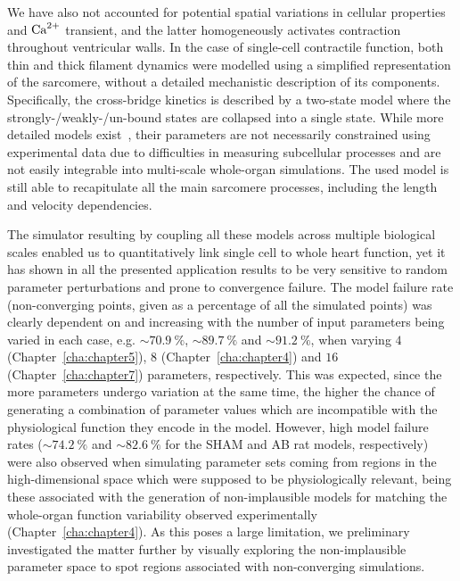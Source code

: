 \vspace{0.2cm}
We have also not accounted for potential spatial variations in cellular properties and $\textrm{Ca}^{2+}$ transient, and the latter homogeneously activates contraction throughout ventricular walls. In the case of single-cell contractile function, both thin and thick filament dynamics were modelled using a simplified representation of the sarcomere, without a detailed mechanistic description of its components. Specifically, the cross-bridge kinetics is described by a two-state model where the strongly-/weakly-/un-bound states are collapsed into a single state. While more detailed models exist~\cite{Land:2015}, their parameters are not necessarily constrained using experimental data due to difficulties in measuring subcellular processes and are not easily integrable into multi-scale whole-organ simulations. The used model is still able to recapitulate all the main sarcomere processes, including the length and velocity dependencies.

\vspace{0.2cm}
The simulator resulting by coupling all these models across multiple biological scales enabled us to quantitatively link single cell to whole heart function, yet it has shown in all the presented application results to be very sensitive to random parameter perturbations and prone to convergence failure. The model failure rate (non-converging points, given as a percentage of all the simulated points) was clearly dependent on and increasing with the number of input parameters being varied in each case, e.g. $\sim\SI{70.9}{\percent}$, $\sim\SI{89.7}{\percent}$ and $\sim\SI{91.2}{\percent}$, when varying $4$ (Chapter~\ref{cha:chapter5}), $8$ (Chapter~\ref{cha:chapter4}) and $16$ (Chapter~\ref{cha:chapter7}) parameters, respectively. This was expected, since the more parameters undergo variation at the same time, the higher the chance of generating a combination of parameter values which are incompatible with the physiological function they encode in the model. However, high model failure rates ($\sim\SI{74.2}{\percent}$ and $\sim\SI{82.6}{\percent}$ for the SHAM and AB rat models, respectively) were also observed when simulating parameter sets coming from regions in the high-dimensional space which were supposed to be physiologically relevant, being these associated with the generation of non-implausible models for matching the whole-organ function variability observed experimentally (Chapter~\ref{cha:chapter4}). As this poses a large limitation, we preliminary investigated the matter further by visually exploring the non-implausible parameter space to spot regions associated with non-converging simulations.

